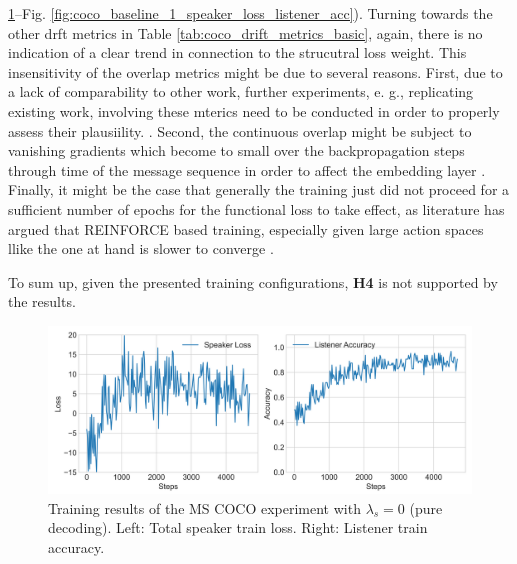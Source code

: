 \ref{fig:coco_baseline_0_speaker_loss_listener_acc}--Fig. \ref{fig:coco_baseline_1_speaker_loss_listener_acc}). Turning towards the other drft metrics in Table \ref{tab:coco_drift_metrics_basic}, again, there is no indication of a clear trend in connection to the strucutral loss weight. This insensitivity of the overlap metrics might be due to several reasons. First, due to a lack of comparability to other work, further experiments, e. g., replicating existing work, involving these mterics need to be conducted in order to properly assess their plausiility. . Second, the continuous overlap might be subject to vanishing gradients which become to small over the backpropagation steps through time of the message sequence in order to affect the embedding layer . Finally, it might be the case that generally the training just did not proceed for a sufficient number of epochs for the functional loss to take effect, as literature has argued that REINFORCE based training, especially given large action spaces llike the one at hand is slower to converge \parencite{havrylov2017emergence} .

To sum up, given the presented training configurations, \textbf{H4} is not supported by the results. 

\begin{figure}
	\centering
	\includegraphics[width=\linewidth]{images/coco_refgame_4000_pure_0_random.png}
	\caption{Training results of the MS COCO experiment with $\lambda_s = 0$ (pure decoding). Left: Total speaker train loss. Right: Listener train accuracy.}
	\label{fig:coco_baseline_0_speaker_loss_listener_acc}
\end{figure}

